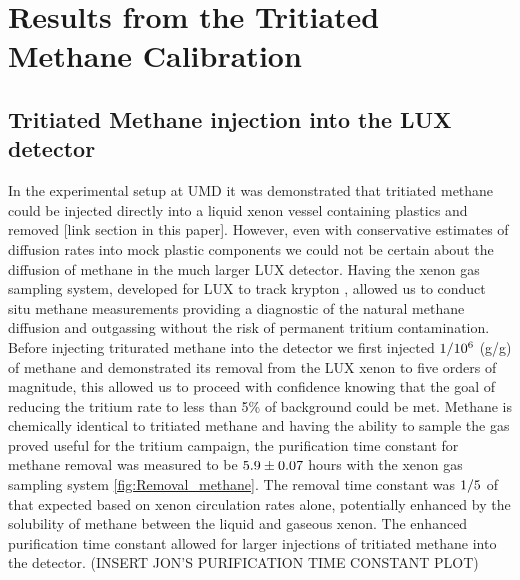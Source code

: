 \section{Results from the Tritiated Methane Calibration}

\subsection{Tritiated Methane injection into the LUX detector}

In the experimental setup at UMD it was demonstrated that tritiated methane could be injected directly into a liquid xenon vessel containing plastics and removed [link section in this paper]. However, even with conservative estimates of diffusion rates into mock plastic components we could not be certain about the diffusion of methane in the much larger LUX detector. Having the xenon gas sampling system, developed for LUX to track krypton \cite{Kr_ppt_Dobi} \cite{EXO_SAM}, allowed us to conduct situ methane measurements providing a diagnostic of the natural methane diffusion and outgassing without the risk of permanent tritium contamination. Before injecting triturated methane into the detector we first injected $\rm 1/10^{6}$ (g/g) of methane and demonstrated its removal from the LUX xenon to five orders of magnitude, this allowed us to proceed with confidence knowing that the goal of reducing the tritium rate to less than 5\% of background could be met. Methane is chemically identical to tritiated methane and having the ability to sample the gas proved useful for the tritium campaign, the purification time constant for methane removal was measured to be $\rm 5.9 \pm 0.07$ hours with the xenon gas sampling system \ref{fig:Removal_methane}. The removal time constant was $\rm 1/5$ of that expected based on xenon circulation rates alone, potentially enhanced by the solubility of methane between the liquid and gaseous xenon. The enhanced purification time constant allowed for larger injections of tritiated methane into the detector.  (INSERT JON'S PURIFICATION TIME CONSTANT PLOT)


